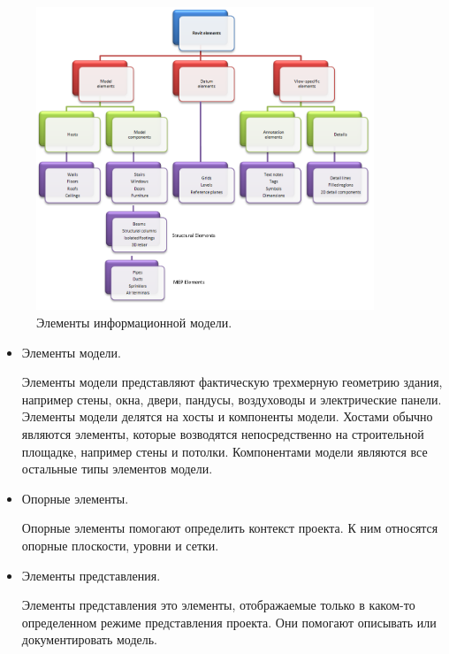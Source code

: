 \begin{figure}[ht]
    \centering
    \includegraphics[width=0.9\textwidth]{images/Revit-elements.png}
    \caption{Элементы информационной модели.%
    \cite{DocRevit}}
    \label{figure:RevitElements}
\end{figure}

\begin{itemize}
    \item {
        Элементы модели.

        Элементы модели представляют фактическую трехмерную геометрию здания,
        например стены, окна, двери, пандусы,
        воздуховоды и электрические панели.
        Элементы модели делятся на хосты и компоненты модели.
        Хостами обычно являются элементы,
        которые возводятся непосредственно на строительной площадке,
        например стены и потолки.
        Компонентами модели являются все остальные типы элементов модели.
    }
    \item {
        Опорные элементы.

        Опорные элементы помогают определить контекст проекта.
        К ним относятся опорные плоскости, уровни и сетки.
    }
    \item {
        Элементы представления.

        Элементы представления это элементы,
        отображаемые только в каком-то определенном режиме представления проекта.
        Они помогают описывать или документировать модель.
    }
\end{itemize}

